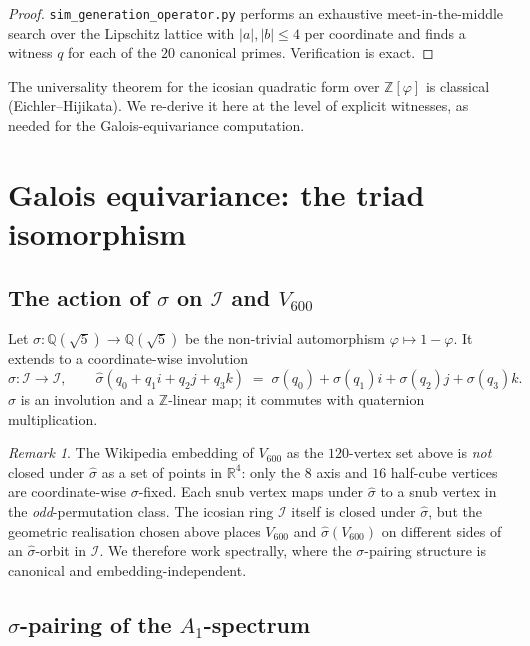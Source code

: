 \documentclass[11pt,a4paper]{article}
\theoremstyle{definition}
\theoremstyle{remark}
\newtheorem{remark}[theorem]{Remark}
\newcommand{\Z}{\mathbb{Z}}
\newcommand{\Q}{\mathbb{Q}}
\newcommand{\R}{\mathbb{R}}
\newcommand{\II}{\mathcal{I}}
\newcommand{\Zphi}{\Z[\varphi]}
\begin{document}
\begin{proof}
\texttt{sim\_generation\_operator.py} performs an exhaustive meet-in-the-middle
search over the Lipschitz lattice with $|a|,|b| \leq 4$ per coordinate and
finds a witness $q$ for each of the $20$ canonical primes. Verification is
exact.
\end{proof}

The universality theorem for the icosian quadratic form over $\Zphi$ is
classical (Eichler--Hijikata). We re-derive it here at the level of explicit
witnesses, as needed for the Galois-equivariance computation.

\bigskip

\section{Galois equivariance: the triad isomorphism}\label{sec:sigma}

\subsection{The action of $\sigma$ on $\II$ and $V_{600}$}

Let $\sigma : \Q(\sqrt 5) \to \Q(\sqrt 5)$ be the non-trivial automorphism
$\varphi \mapsto 1-\varphi$. It extends to a coordinate-wise involution
\[
  \widehat\sigma : \II \to \II, \qquad
  \widehat\sigma(q_0 + q_1 i + q_2 j + q_3 k) \;=\; \sigma(q_0) + \sigma(q_1) i + \sigma(q_2) j + \sigma(q_3) k.
\]
$\widehat\sigma$ is an involution and a $\Z$-linear map; it commutes with
quaternion multiplication.

\begin{remark}
The Wikipedia embedding of $V_{600}$ as the $120$-vertex set above is
\emph{not} closed under $\widehat\sigma$ as a set of points in $\R^4$: only
the $8$ axis and $16$ half-cube vertices are coordinate-wise $\sigma$-fixed.
Each snub vertex maps under $\widehat\sigma$ to a snub vertex in the
\emph{odd}-permutation class. The icosian ring $\II$ itself is closed under
$\widehat\sigma$, but the geometric realisation chosen above places $V_{600}$
and $\widehat\sigma(V_{600})$ on different sides of an $\widehat\sigma$-orbit
in $\II$. We therefore work spectrally, where the $\sigma$-pairing structure
is canonical and embedding-independent.
\end{remark}

\subsection{$\sigma$-pairing of the $A_1$-spectrum}
\end{document}
